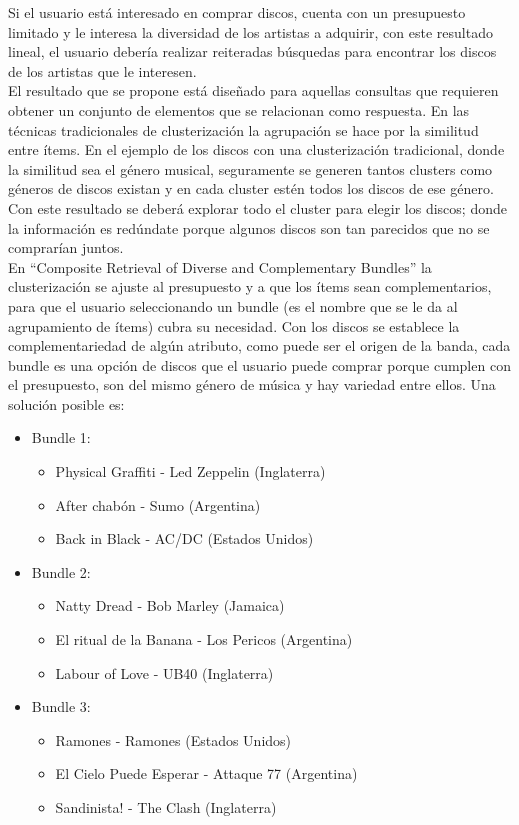 Si el usuario está interesado en comprar discos, cuenta con un presupuesto limitado y le interesa la diversidad de los artistas a adquirir, con este resultado lineal, el usuario debería realizar reiteradas búsquedas para encontrar los discos de los artistas que le interesen.\\


El resultado que se propone está diseñado para aquellas consultas que requieren obtener un conjunto de elementos que se relacionan como respuesta. En las técnicas tradicionales de clusterización la agrupación se hace por la similitud entre ítems. En el ejemplo de los discos con una clusterización tradicional, donde la similitud sea el género musical, seguramente se generen tantos clusters como géneros de discos existan y en cada cluster estén todos los discos de ese género. Con este resultado se deberá explorar todo el cluster para elegir los discos; donde la información es redúndate porque algunos discos son tan parecidos que no se comprarían juntos.\\
En ``Composite Retrieval of Diverse and Complementary Bundles'' la clusterización se ajuste al presupuesto y a que los ítems sean complementarios, para que el usuario seleccionando un bundle (es el nombre que se le da al agrupamiento de ítems) cubra su necesidad. Con los discos se establece la complementariedad de algún atributo, como puede ser el origen de la banda, cada bundle es una opción de discos que el usuario puede comprar porque cumplen con el presupuesto, son del mismo género de música y hay variedad entre ellos. Una solución posible es:
\begin{itemize}
  \item Bundle 1:
  \begin{itemize}
    \item Physical Graffiti - Led Zeppelin (Inglaterra)
    \item After chabón - Sumo (Argentina)
    \item Back in Black - AC/DC (Estados Unidos)
  \end{itemize}
  \item Bundle 2:
  \begin{itemize}
    \item Natty Dread - Bob Marley (Jamaica)
    \item El ritual de la Banana - Los Pericos (Argentina)
    \item Labour of Love - UB40 (Inglaterra)
  \end{itemize}
	  \item Bundle 3:
  \begin{itemize}
    \item Ramones - Ramones (Estados Unidos)
    \item El Cielo Puede Esperar - Attaque 77 (Argentina)
    \item Sandinista! - The Clash (Inglaterra)
  \end{itemize}
\end{itemize}

